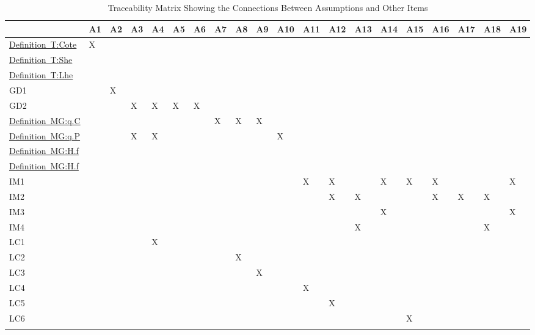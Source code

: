 \documentclass[12pt]{article}
\begin{document}
\begin{longtable}{l l l l l l l l l l l l l l l l l l l l}
\toprule
 & A1 & A2 & A3 & A4 & A5 & A6 & A7 & A8 & A9 & A10 & A11 & A12 & A13 & A14 & A15 & A16 & A17 & A18 & A19
\\
\midrule
\hyperref[T:Cote]{Definition~T:Cote} & X &  &  &  &  &  &  &  &  &  &  &  &  &  &  &  &  &  & 
\\
\hyperref[T:She]{Definition~T:She} &  &  &  &  &  &  &  &  &  &  &  &  &  &  &  &  &  &  & 
\\
\hyperref[T:Lhe]{Definition~T:Lhe} &  &  &  &  &  &  &  &  &  &  &  &  &  &  &  &  &  &  & 
\\
GD1 &  & X &  &  &  &  &  &  &  &  &  &  &  &  &  &  &  &  & 
\\
GD2 &  &  & X & X & X & X &  &  &  &  &  &  &  &  &  &  &  &  & 
\\
\hyperref[MG:q.C]{Definition~MG:q.C} &  &  &  &  &  &  & X & X & X &  &  &  &  &  &  &  &  &  & 
\\
\hyperref[MG:q.P]{Definition~MG:q.P} &  &  & X & X &  &  &  &  &  & X &  &  &  &  &  &  &  &  & 
\\
\hyperref[MG:H.f]{Definition~MG:H.f} &  &  &  &  &  &  &  &  &  &  &  &  &  &  &  &  &  &  & 
\\
\hyperref[MG:H.f]{Definition~MG:H.f} &  &  &  &  &  &  &  &  &  &  &  &  &  &  &  &  &  &  & 
\\
IM1 &  &  &  &  &  &  &  &  &  &  & X & X &  & X & X & X &  &  & X
\\
IM2 &  &  &  &  &  &  &  &  &  &  &  & X & X &  &  & X & X & X & 
\\
IM3 &  &  &  &  &  &  &  &  &  &  &  &  &  & X &  &  &  &  & X
\\
IM4 &  &  &  &  &  &  &  &  &  &  &  &  & X &  &  &  &  & X & 
\\
LC1 &  &  &  & X &  &  &  &  &  &  &  &  &  &  &  &  &  &  & 
\\
LC2 &  &  &  &  &  &  &  & X &  &  &  &  &  &  &  &  &  &  & 
\\
LC3 &  &  &  &  &  &  &  &  & X &  &  &  &  &  &  &  &  &  & 
\\
LC4 &  &  &  &  &  &  &  &  &  &  & X &  &  &  &  &  &  &  & 
\\
LC5 &  &  &  &  &  &  &  &  &  &  &  & X &  &  &  &  &  &  & 
\\
LC6 &  &  &  &  &  &  &  &  &  &  &  &  &  &  & X &  &  &  & 
\\
\bottomrule
\caption{Traceability Matrix Showing the Connections Between Assumptions and Other Items}
\label{Table:TMStCBAsaOI}
\end{longtable}
\end{document}
